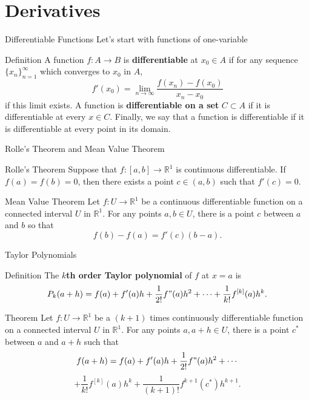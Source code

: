 \documentclass{beamer}
\begin{document}
\section{Derivatives}

\begin{frame}{Differentiable Functions}
Let's start with functions of one-variable
\begin{block}{Definition}
A function $f:A\to B$ is \textbf{differentiable} at $x_0\in A$ if for any sequence $\{x_n\}_{n=1}^\infty$ which converges to $x_0$ in $A$, 
\[
f'(x_0)=\lim_{n\to \infty}\frac{f(x_n)-f(x_0)}{x_n-x_0}
\]
if this limit exists. A function is \textbf{differentiable on a set} $C\subset A$ if it is differentiable at every $x\in C$. Finally, we say that a function is differentiable if it is differentiable at every point in its domain.
\end{block}
\end{frame}
\begin{frame}{Rolle's Theorem and Mean Value Theorem}
    \begin{block}{Rolle's Theorem}
    Suppose that $f:[a,b]\to \mathbb{R}^1$ is continuous differentiable. If $f(a)=f(b)=0$, then there exists a point $c\in (a, b)$ such that $f'(c)=0$.
    \end{block}
     \begin{block}{Mean Value Theorem}
   Let  $f:U\to \mathbb{R}^1$ be a  continuous differentiable function on a connected interval $U$ in $\mathbb{R}^1$. For any points $a, b \in U$, there is a point $c$ between $a$ and $b$ so that 
   \[f(b)-f(a)=f'(c)(b-a).
   \]
    \end{block}
\end{frame}

\begin{frame}{Taylor Polynomials}
    \begin{block}{Definition}
    The \textbf{$k$th order Taylor polynomial} of $f$ at $x=a$ is 
    \[P_k(a+h)=f(a)+f'(a)h+\frac{1}{2! }f"(a)h^2+\cdots +\frac{1}{k!}f^{[k]}(a)h^k.
    \]
    \end{block}
    \begin{block}{Theorem}
     Let  $f:U\to \mathbb{R}^1$ be a $(k+1)$ times continuously differentiable function on a connected interval $U$ in $\mathbb{R}^1$. For any points $a, a+h \in U$, there is a point $c^*$ between $a$ and $a+h$ such that 
     \[f(a+h)=f(a)+f'(a)h+\frac{1}{2! }f"(a)h^2+\cdots\]
     \[+\frac{1}{k!}f^{[k]}(a)h^k+\frac{1}{(k+1)!}f^{k+1}(c^*)h^{k+1}.
     \]
    \end{block}
\end{frame}
\end{document}
